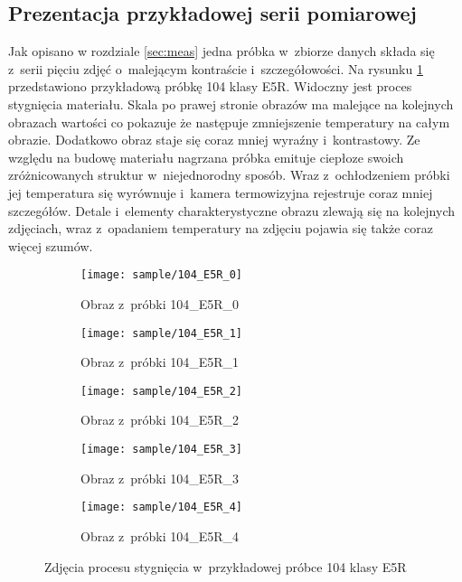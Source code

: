 \subsection{Prezentacja przykładowej serii pomiarowej}
Jak opisano w rozdziale \ref{sec:meas} jedna próbka w~zbiorze danych 
składa się z~serii pięciu zdjęć o~malejącym kontraście i~szczegółowości.
Na rysunku \ref{fig:sample} przedstawiono przykładową próbkę 104 klasy E5R.
Widoczny jest proces stygnięcia materiału.
Skala po prawej stronie obrazów ma malejące na kolejnych obrazach wartości
co pokazuje że następuje zmniejszenie temperatury na całym obrazie.
Dodatkowo obraz staje się coraz mniej wyraźny i~kontrastowy.
Ze względu na budowę materiału nagrzana próbka emituje ciepłoze swoich
zróżnicowanych struktur w~niejednorodny sposób.
Wraz z~ochłodzeniem próbki jej temperatura się wyrównuje i~kamera termowizyjna
rejestruje coraz mniej szczegółów.
Detale i~elementy charakterystyczne obrazu zlewają się na kolejnych zdjęciach,
wraz z~opadaniem temperatury na zdjęciu pojawia się także coraz więcej szumów.
\begin{figure}[htbp]
	\centering
	\begin{subfigure}{0.45\textwidth}
		\centering
		\texttt{[image: sample/104\_E5R\_0]}
		\caption{Obraz z~próbki 104\_E5R\_0}
	\end{subfigure}
	\hspace{0.75cm}
	\vspace{0.5cm}
	\begin{subfigure}{0.45\textwidth}
		\centering
		\texttt{[image: sample/104\_E5R\_1]}
		\caption{Obraz z~próbki 104\_E5R\_1}
	\end{subfigure}
	\begin{subfigure}{0.45\textwidth}
		\centering
		\texttt{[image: sample/104\_E5R\_2]}
		\caption{Obraz z~próbki 104\_E5R\_2}
	\end{subfigure}
	\hspace{0.75cm}
	\vspace{0.5cm}
	\begin{subfigure}{0.45\textwidth}
		\centering
		\texttt{[image: sample/104\_E5R\_3]}
		\caption{Obraz z~próbki 104\_E5R\_3}
	\end{subfigure}
	\begin{subfigure}{0.45\textwidth}
		\centering
		\texttt{[image: sample/104\_E5R\_4]}
		\caption{Obraz z~próbki 104\_E5R\_4}
	\end{subfigure}
	\caption{Zdjęcia procesu stygnięcia w~przykładowej próbce 104 klasy E5R}
	\label{fig:sample}
\end{figure}

